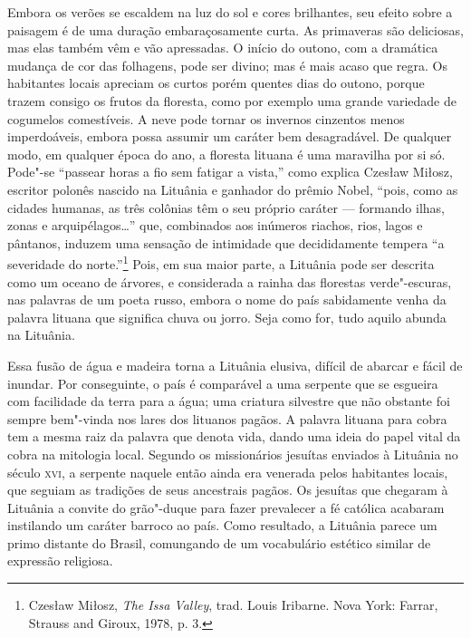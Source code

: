 Embora os verões se escaldem na luz do sol e cores
brilhantes, seu efeito sobre a paisagem é de uma duração embaraçosamente
curta. As primaveras são deliciosas, mas elas também vêm e vão
apressadas. O início do outono, com a dramática mudança de cor das
folhagens, pode ser divino; mas é mais acaso que regra. Os habitantes
locais apreciam os curtos porém quentes dias do outono, porque trazem
consigo os frutos da floresta, como por exemplo uma grande variedade de
cogumelos comestíveis. A neve pode tornar os invernos cinzentos menos
imperdoáveis, embora possa assumir um caráter bem desagradável. De
qualquer modo, em qualquer época do ano, a floresta lituana é uma
maravilha por si só. Pode"-se ``passear horas a fio sem fatigar a
vista,'' como explica Czesław Miłosz, escritor polonês nascido na
Lituânia e ganhador do prêmio Nobel, ``pois, como as cidades humanas, as
três colônias têm o seu próprio caráter --- formando ilhas, zonas e
arquipélagos\ldots{}'' que, combinados aos inúmeros riachos, rios, lagos
e pântanos, induzem uma sensação de intimidade que decididamente tempera
``a severidade do norte.''\footnote{Czesław Miłosz, \textit{The Issa
  Valley}, trad. Louis Iribarne. Nova York: Farrar, Strauss and
  Giroux, 1978, p. 3.} Pois, em sua maior parte, a Lituânia pode ser
descrita como um oceano de árvores, e considerada a rainha das florestas
verde"-escuras, nas palavras de um poeta russo, embora o nome do país
sabidamente venha da palavra lituana que significa chuva ou jorro. Seja
como for, tudo aquilo abunda na Lituânia.

Essa fusão de água e madeira torna a Lituânia elusiva, difícil de
abarcar e fácil de inundar. Por conseguinte, o país é comparável a uma
serpente que se esgueira com facilidade da terra para a água; uma
criatura silvestre que não obstante foi sempre bem"-vinda nos lares dos
lituanos pagãos. A palavra lituana para cobra tem a mesma raiz da
palavra que denota vida, dando uma ideia do papel vital da cobra na
mitologia local. Segundo os missionários jesuítas enviados à Lituânia no
século \textsc{xvi}, a serpente naquele então ainda era venerada pelos
habitantes locais, que seguiam as tradições de seus ancestrais pagãos.
Os jesuítas que chegaram à Lituânia a convite do grão"-duque para fazer
prevalecer a fé católica acabaram instilando um caráter barroco ao país.
Como resultado, a Lituânia parece um primo distante do Brasil,
comungando de um vocabulário estético similar de expressão religiosa.

